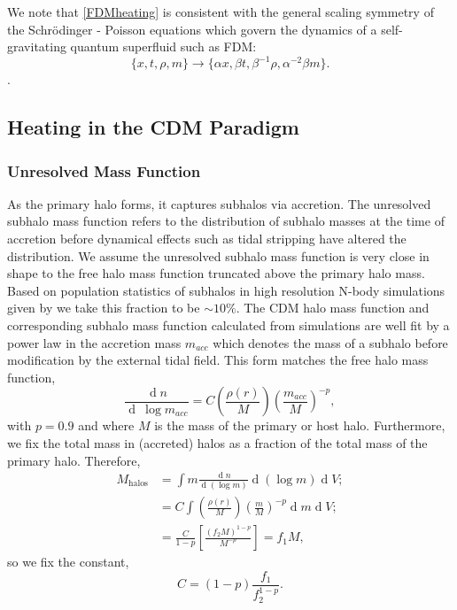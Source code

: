 \documentclass[usenatbib]{mnras}
\renewcommand{\d}[1]{\! \mathrm{d}#1 \:}
\newcommand{\deriv}[2]{\frac{\d{#1}}{\d{#2}}}
\renewcommand{\d}[1]{\ensuremath{\operatorname{d}\!{#1}}}
\begin{document}
\par
We note that \eqref{FDMheating} is consistent with the general scaling symmetry of the Schr\"{o}dinger - Poisson equations which govern the dynamics of a self-gravitating quantum superfluid such as FDM:
\begin{equation}
\{ x, t , \rho, m \} \to \{\alpha x, \beta t, \beta^{-1} \rho, \alpha^{-2} \beta m \} .
\end{equation}
\noindent \citep{Schrodinger-Poisson}.
\subsection{Heating in the CDM Paradigm}
\subsubsection{Unresolved Mass Function}

As the primary halo forms, it captures subhalos via accretion. The unresolved subhalo mass function refers to the distribution of subhalo masses at the time of accretion before dynamical effects such as tidal stripping have altered the distribution. We assume the unresolved subhalo mass function is very close in shape to the free halo mass function truncated above the primary halo mass. Based on population statistics of subhalos in high resolution N-body simulations given by \citet{subhalo_abundance} we take this fraction to be $\sim 10\%$. The CDM halo mass function and corresponding subhalo mass function calculated from simulations \citep{pop_of_subhalos, unified_model} are well fit by a power law in the accretion mass $m_{acc}$ which denotes the mass of a subhalo before modification by the external tidal field. This form matches the free halo mass function, 
\begin{equation}
\frac{\d{n}}{\d{\: \log{m_{acc}}}} = C \left(\frac{\rho(r)}{M}\right) \left(\frac{m_{acc}}{M} \right)^{-p} ,
\end{equation}
with $p = 0.9$ and where $M$ is the mass of the primary or host halo.
Furthermore, we fix the total mass in (accreted) halos as a fraction of the total mass of the primary halo. Therefore,
\begin{subequations}
\begin{align}
M_{\mathrm{halos}} & = \int m \deriv{n}{(\log{m})} \d{(\log{m})} \d{V} ;
\\
& = C \int \left(\frac{\rho(r)}{M}\right) \left(\frac{m}{M} \right)^{-p} \d{m} \d{V} ;
\\
& = \frac{C}{1-p} \left[ \frac{(f_2 M)^{1-p}}{M^{-p}} \right] = f_1 M ,
\end{align} 
\end{subequations}
so we fix the constant,
\begin{equation}
C = (1 - p)\frac{f_1}{f_2^{1-p}} .
\end{equation}
\end{document}
